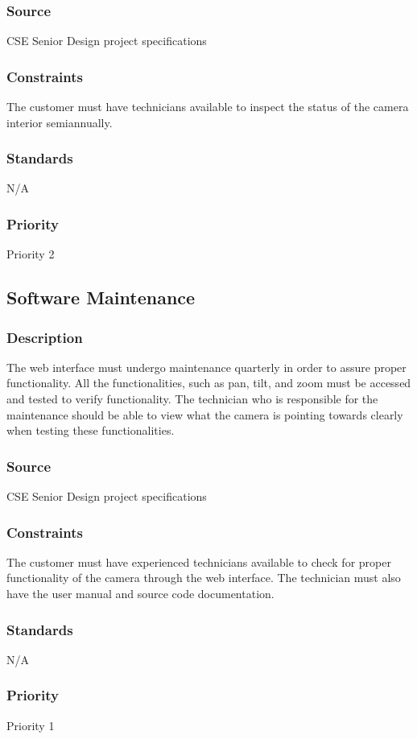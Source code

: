 \subsubsection{Source}
CSE Senior Design project specifications
\subsubsection{Constraints}
The customer must have technicians available to inspect the status of the camera interior semiannually. 
\subsubsection{Standards}
N/A
\subsubsection{Priority}
Priority 2

\subsection{Software Maintenance}
\subsubsection{Description}
The web interface must undergo maintenance quarterly in order to assure proper functionality. All the functionalities, such as pan, tilt, and zoom must be accessed and tested to verify functionality. The technician who is responsible for the maintenance should be able to view what the camera is pointing towards clearly when testing these functionalities. 
\subsubsection{Source}
CSE Senior Design project specifications
\subsubsection{Constraints}
The customer must have experienced technicians available to check for proper functionality of the camera through the web interface. The technician must also have the user manual and source code documentation. 
\subsubsection{Standards}
N/A
\subsubsection{Priority}
Priority 1
